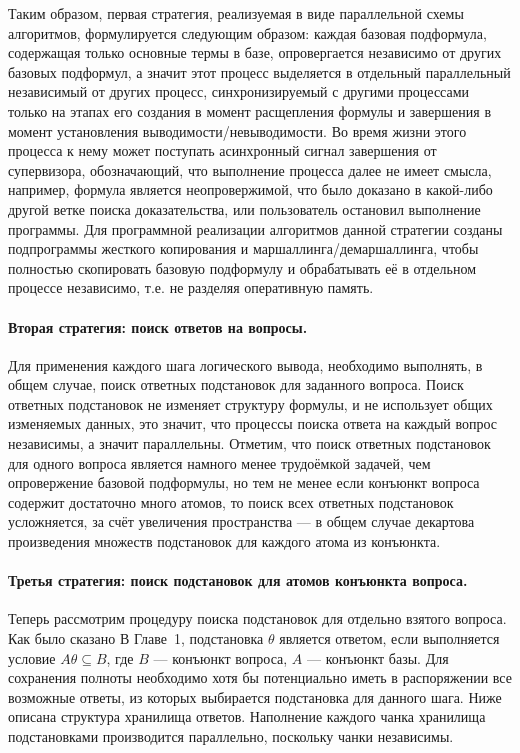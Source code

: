Таким образом, первая стратегия, реализуемая в виде параллельной схемы алгоритмов, формулируется следующим образом: каждая базовая подформула, содержащая только основные термы в базе, опровергается независимо от других базовых подформул, а значит этот процесс выделяется в отдельный параллельный независимый от других процесс, синхронизируемый с другими процессами только  на этапах его создания в момент расщепления формулы и завершения в момент установления выводимости/невыводимости. Во время жизни этого процесса к нему может поступать асинхронный сигнал завершения от супервизора, обозначающий, что выполнение процесса далее не имеет смысла, например, формула является неопровержимой, что было доказано в какой-либо другой ветке поиска доказательства, или пользователь остановил выполнение программы. Для программной реализации алгоритмов данной стратегии созданы подпрограммы жесткого копирования и маршаллинга/демаршаллинга, чтобы полностью скопировать базовую подформулу и обрабатывать её в отдельном процессе независимо, т.е. не разделяя оперативную память.


\paragraph{Вторая стратегия: поиск ответов на вопросы.}
Для применения каждого шага логического вывода, необходимо выполнять, в общем случае, поиск ответных подстановок для заданного вопроса. Поиск ответных подстановок не изменяет структуру формулы, и не использует общих изменяемых данных, это значит, что процессы поиска ответа на каждый вопрос независимы, а значит параллельны. Отметим, что поиск ответных подстановок для одного вопроса является намного менее трудоёмкой задачей, чем опровержение базовой подформулы, но тем не менее если конъюнкт вопроса содержит достаточно много атомов, то поиск всех ответных подстановок усложняется, за счёт увеличения пространства --- в общем случае декартова произведения множеств подстановок для каждого атома из конъюнкта.



\paragraph{Третья стратегия: поиск подстановок для атомов конъюнкта вопроса.}
Теперь рассмотрим процедуру поиска подстановок для отдельно взятого вопроса. Как было сказано В Главе~1, подстановка $\theta$ является ответом, если выполняется условие $A\theta \subseteq B$, где $B$ --- конъюнкт вопроса, $A$ --- конъюнкт базы. Для сохранения полноты необходимо хотя бы потенциально иметь в распоряжении все возможные ответы, из которых выбирается подстановка для данного шага. Ниже описана структура хранилища ответов. Наполнение каждого чанка хранилища подстановками производится параллельно, поскольку чанки независимы.

